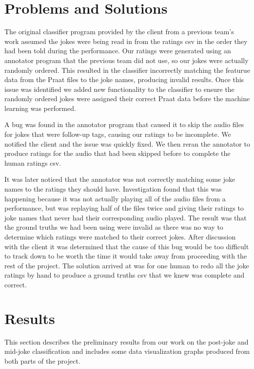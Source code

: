 \documentclass[onecolumn, draftclsnofoot,10pt, compsoc]{IEEEtran}
\begin{document}
\section{Problems and Solutions}
The original classifier program provided by the client from a previous team's work assumed the jokes were being read in from the ratings csv in the order they had been told during the performance. Our ratings were generated using an annotator program that the previous team did not use, so our jokes were actually randomly ordered. This resulted in the classifier incorrectly matching the featurue data from the Praat files to the joke names, producing invalid results. Once this issue was identified we added new functionality to the classifier to ensure the randomly ordered jokes were assigned their correct Praat data before the machine learning was performed.\par
\vspace{.3cm}
\noindent A bug was found in the annotator program that caused it to skip the audio files for jokes that were follow-up tags, causing our ratings to be incomplete. We notified the client and the issue was quickly fixed. We then reran the annotator to produce ratings for the audio that had been skipped before to complete the human ratings csv.\par
\vspace{.3cm}
\noindent It was later noticed that the annotator was not correctly matching some joke names to the ratings they should have. Investigation found that this was happening because it was not actually playing all of the audio files from a performance, but was replaying half of the files twice and giving their ratings to joke names that never had their corresponding audio played. The result was that the ground truths we had been using were invalid as there was no way to determine which ratings were matched to their correct jokes. After discussion with the client it was determined that the cause of this bug would be too difficult to track down to be worth the time it would take away from proceeding with the rest of the project. The solution arrived at was for one human to redo all the joke ratings by hand to produce a ground truths csv that we knew was complete and correct.

\section{Results}
This section describes the preliminary results from our work on the post-joke and mid-joke classification and includes some data visualization graphs produced from both parts of the project.
\end{document}
